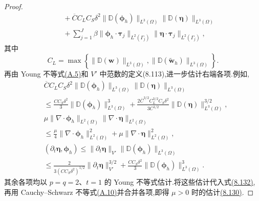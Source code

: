 \begin{lemma}[误差估计所需的微分不等式]
\begin{proof}
\[\begin{aligned}
 &\quad+\overline C C_L C_S\delta^2
       \|\mathbb{D}(\symbf{\phi}_h)\|_{L^3(\Omega)}
       \|\mathbb{D}(\symbf{\eta})\|_{L^3(\Omega)}\\
 &\quad+\sum_{j=1}^J\beta
       \|\symbf{\phi}_h\cdot\symbf{\tau}_j\|_{L^2(\Gamma_j)}
       \|\symbf{\eta}\cdot\symbf{\tau}_j\|_{L^2(\Gamma_j)},
\end{aligned}
\]
其中
\begin{equation}\label{eq:smagorinsky-error-lipschitz-constant}
 C_L=\max\left\{
       \|\mathbb{D}(\bm{w})\|_{L^3(\Omega)},
       \|\mathbb{D}(\widetilde{\bm{w}}_h)\|_{L^3(\Omega)}
       \right\}.
\end{equation}
再由 Young 不等式\hyperref[eq:appendix-a-5]{(A.5)}和 $V'$ 中范数的定义(8.113),进一步估计右端各项.例如,
\[
\begin{aligned}
 &\overline C C_L C_S\delta^2
       \|\mathbb{D}(\symbf{\phi}_h)\|_{L^3(\Omega)}
       \|\mathbb{D}(\symbf{\eta})\|_{L^3(\Omega)}\\
 &\le \frac{C C_S\delta^2}{3}
       \|\mathbb{D}(\symbf{\phi}_h)\|_{L^3(\Omega)}^3
  +\frac{2\overline C^{3/2}C_L^{3/2}C_S\delta^2}{3C^{1/2}}
       \|\mathbb{D}(\symbf{\eta})\|_{L^3(\Omega)}^{3/2},\\[0.4em]
 &\mu\|\nabla\cdot\symbf{\phi}_h\|_{L^2(\Omega)}
       \|\nabla\cdot\symbf{\eta}\|_{L^2(\Omega)}\\
 &\le \frac\mu4
       \|\nabla\cdot\symbf{\phi}_h\|_{L^2(\Omega)}^2
  +\mu\|\nabla\cdot\symbf{\eta}\|_{L^2(\Omega)}^2,\\[0.4em]
 &(\partial_t\symbf{\eta},\symbf{\phi}_h)
  \le \|\partial_t\symbf{\eta}\|_{V'}
       \|\mathbb{D}(\symbf{\phi}_h)\|_{L^3(\Omega)}\\
 &\le \frac{2}{3(CC_S\delta^2)^{1/2}}
       \|\partial_t\symbf{\eta}\|_{V'}^{3/2}
  +\frac{CC_S\delta^2}{3}
       \|\mathbb{D}(\symbf{\phi}_h)\|_{L^3(\Omega)}^3.
\end{aligned}
\]
其余各项均以 $p=q=2$、$t=1$ 的 Young 不等式估计.将这些估计代入式\hyperref[eq:smagorinsky-error-equation-tested]{(8.132)},再用 Cauchy--Schwarz 不等式\hyperref[eq:appendix-a-10]{(A.10)}并合并各项,即得 $\mu>0$ 时的估计\hyperref[eq:smagorinsky-error-differential-bound]{(8.130)}.
\end{proof}
\end{lemma}

